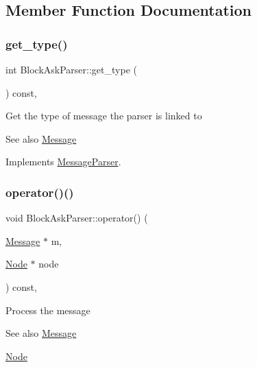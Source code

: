 \subsection{Member Function Documentation}
\mbox{\label{classBlockAskParser_add75da897c34702c33790947c9754500}} 
\subsubsection{\texorpdfstring{get\+\_\+type()}{get\_type()}}
{\footnotesize\ttfamily int Block\+Ask\+Parser\+::get\+\_\+type (\begin{DoxyParamCaption}{ }\end{DoxyParamCaption}) const\hspace{0.3cm}{\ttfamily [final]}, {\ttfamily [virtual]}}

Get the type of message the parser is linked to \begin{DoxySeeAlso}{See also}
\mbox{\hyperlink{classMessage}{Message}} 
\end{DoxySeeAlso}


Implements \mbox{\hyperlink{classMessageParser_aa7c495d7b28a394e5752ca25ffff69d8}{Message\+Parser}}.

\mbox{\label{classBlockAskParser_a32d280786db26389f58175681ba35261}} 
\subsubsection{\texorpdfstring{operator()()}{operator()()}}
{\footnotesize\ttfamily void Block\+Ask\+Parser\+::operator() (\begin{DoxyParamCaption}\item[{\mbox{\hyperlink{classMessage}{Message}} $\ast$}]{m,  }\item[{\mbox{\hyperlink{classNode}{Node}} $\ast$}]{node }\end{DoxyParamCaption}) const\hspace{0.3cm}{\ttfamily [final]}, {\ttfamily [virtual]}}

Process the message \begin{DoxySeeAlso}{See also}
\mbox{\hyperlink{classMessage}{Message}} 

\mbox{\hyperlink{classNode}{Node}}
\end{DoxySeeAlso}

